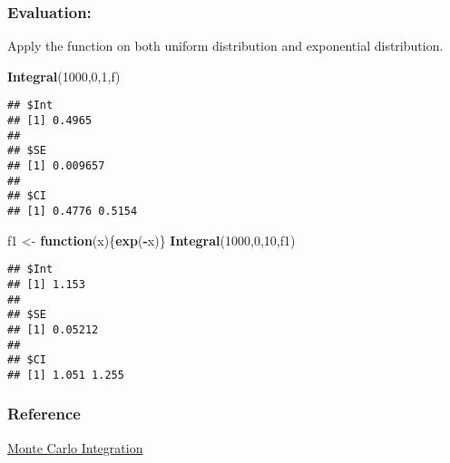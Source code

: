 \documentclass[
]{article}
\newenvironment{Shaded}{\begin{snugshade}}{\end{snugshade}}
\newcommand{\ControlFlowTok}[1]{\textcolor[rgb]{0.13,0.29,0.53}{\textbf{#1}}}
\newcommand{\DecValTok}[1]{\textcolor[rgb]{0.00,0.00,0.81}{#1}}
\newcommand{\KeywordTok}[1]{\textcolor[rgb]{0.13,0.29,0.53}{\textbf{#1}}}
\newcommand{\NormalTok}[1]{#1}
\newcommand{\OperatorTok}[1]{\textcolor[rgb]{0.81,0.36,0.00}{\textbf{#1}}}
\newcommand{\StringTok}[1]{\textcolor[rgb]{0.31,0.60,0.02}{#1}}
\begin{document}
\hypertarget{evaluation}{%
\subsubsection{Evaluation:}\label{evaluation}}

Apply the function on both uniform distribution and exponential
distribution.

\begin{Shaded}
\begin{Highlighting}[]
\KeywordTok{Integral}\NormalTok{(}\DecValTok{1000}\NormalTok{,}\DecValTok{0}\NormalTok{,}\DecValTok{1}\NormalTok{,f)}
\end{Highlighting}
\end{Shaded}

\begin{verbatim}
## $Int
## [1] 0.4965
## 
## $SE
## [1] 0.009657
## 
## $CI
## [1] 0.4776 0.5154
\end{verbatim}

\begin{Shaded}
\begin{Highlighting}[]
\NormalTok{f1 <-}\StringTok{ }\ControlFlowTok{function}\NormalTok{(x)\{}\KeywordTok{exp}\NormalTok{(}\OperatorTok{-}\NormalTok{x)\}}
\KeywordTok{Integral}\NormalTok{(}\DecValTok{1000}\NormalTok{,}\DecValTok{0}\NormalTok{,}\DecValTok{10}\NormalTok{,f1)}
\end{Highlighting}
\end{Shaded}

\begin{verbatim}
## $Int
## [1] 1.153
## 
## $SE
## [1] 0.05212
## 
## $CI
## [1] 1.051 1.255
\end{verbatim}

\hypertarget{reference}{%
\subsubsection{Reference}\label{reference}}

\href{https://cran.r-project.org/web/packages/SI/vignettes/my-vignette.html}{Monte
Carlo Integration}
\end{document}
